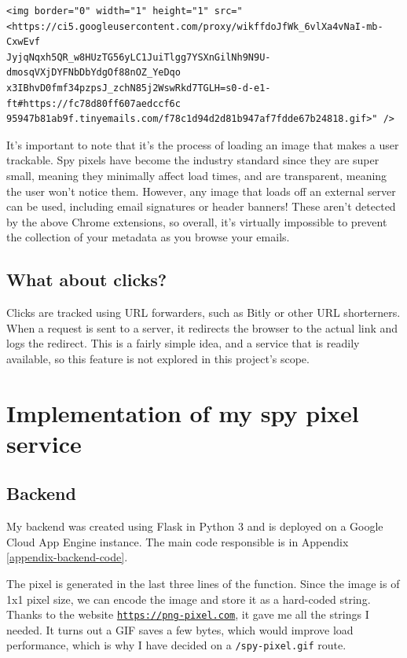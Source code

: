 \documentclass{article}
\begin{document}
\newpage

\begin{lstlisting}
<img border="0" width="1" height="1" src="<https://ci5.googleusercontent.com/proxy/wikffdoJfWk_6vlXa4vNaI-mb-CxwEvf
JyjqNqxh5QR_w8HUzTG56yLC1JuiTlgg7YSXnGilNh9N9U-dmosqVXjDYFNbDbYdgOf88nOZ_YeDqo
x3IBhvD0fmf34pzpsJ_zchN85j2WswRkd7TGLH=s0-d-e1-ft#https://fc78d80ff607aedccf6c
95947b81ab9f.tinyemails.com/f78c1d94d2d81b947af7fdde67b24818.gif>" />
\end{lstlisting}

It's important to note that it's the process of loading an image that makes a user trackable. Spy pixels have become the industry standard since they are super small, meaning they minimally affect load times, and are transparent, meaning the user won't notice them. However, any image that loads off an external server can be used, including email signatures or header banners! These aren't detected by the above Chrome extensions, so overall, it's virtually impossible to prevent the collection of your metadata as you browse your emails.

\subsection{What about clicks?}

Clicks are tracked using URL forwarders, such as Bitly or other URL shorterners. When a request is sent to a server, it redirects the browser to the actual link and logs the redirect. This is a fairly simple idea, and a service that is readily available, so this feature is not explored in this project's scope.

\section{Implementation of my spy pixel service}

\subsection{Backend}

My backend was created using Flask in Python 3 and is deployed on a Google Cloud App Engine instance. The main code responsible is in Appendix \ref{appendix-backend-code}.

The pixel is generated in the last three lines of the function. Since the image is of 1x1 pixel size, we can encode the image and store it as a hard-coded string. Thanks to the website \href{https://png-pixel.com}{\texttt{https://png-pixel.com}}, it gave me all the strings I needed. It turns out a GIF saves a few bytes, which would improve load performance, which is why I have decided on a \texttt{/spy-pixel.gif} route.
\end{document}
